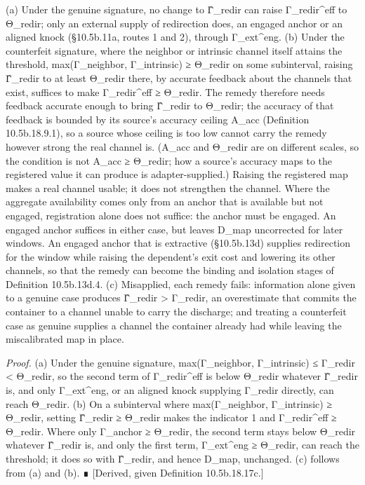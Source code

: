 \documentclass[
]{article}
\begin{document}
(a) Under the genuine signature, no change to Γ̂\_redir can raise
Γ\_redir\^{}eff to Θ\_redir; only an external supply of redirection
does, an engaged anchor or an aligned knock (§10.5b.11a, routes 1 and
2), through Γ\_ext\^{}eng. (b) Under the counterfeit signature, where
the neighbor or intrinsic channel itself attains the threshold,
max(Γ\_neighbor, Γ\_intrinsic) ≥ Θ\_redir on some subinterval, raising
Γ̂\_redir to at least Θ\_redir there, by accurate feedback about the
channels that exist, suffices to make Γ\_redir\^{}eff ≥ Θ\_redir. The
remedy therefore needs feedback accurate enough to bring Γ̂\_redir to
Θ\_redir; the accuracy of that feedback is bounded by its source's
accuracy ceiling A\_acc (Definition 10.5b.18.9.1), so a source whose
ceiling is too low cannot carry the remedy however strong the real
channel is. (A\_acc and Θ\_redir are on different scales, so the
condition is not A\_acc ≥ Θ\_redir; how a source's accuracy maps to the
registered value it can produce is adapter-supplied.) Raising the
registered map makes a real channel usable; it does not strengthen the
channel. Where the aggregate availability comes only from an anchor that
is available but not engaged, registration alone does not suffice: the
anchor must be engaged. An engaged anchor suffices in either case, but
leaves D\_map uncorrected for later windows. An engaged anchor that is
extractive (§10.5b.13d) supplies redirection for the window while
raising the dependent's exit cost and lowering its other channels, so
that the remedy can become the binding and isolation stages of
Definition 10.5b.13d.4. (c) Misapplied, each remedy fails: information
alone given to a genuine case produces Γ̂\_redir \textgreater{} Γ\_redir,
an overestimate that commits the container to a channel unable to carry
the discharge; and treating a counterfeit case as genuine supplies a
channel the container already had while leaving the miscalibrated map in
place.

\emph{Proof.} (a) Under the genuine signature, max(Γ\_neighbor,
Γ\_intrinsic) ≤ Γ\_redir \textless{} Θ\_redir, so the second term of
Γ\_redir\^{}eff is below Θ\_redir whatever Γ̂\_redir is, and only
Γ\_ext\^{}eng, or an aligned knock supplying Γ\_redir directly, can
reach Θ\_redir. (b) On a subinterval where max(Γ\_neighbor,
Γ\_intrinsic) ≥ Θ\_redir, setting Γ̂\_redir ≥ Θ\_redir makes the
indicator 1 and Γ\_redir\^{}eff ≥ Θ\_redir. Where only Γ\_anchor ≥
Θ\_redir, the second term stays below Θ\_redir whatever Γ̂\_redir is, and
only the first term, Γ\_ext\^{}eng ≥ Θ\_redir, can reach the threshold;
it does so with Γ̂\_redir, and hence D\_map, unchanged. (c) follows from
(a) and (b). ∎ {[}Derived, given Definition 10.5b.18.17c.{]}
\end{document}
